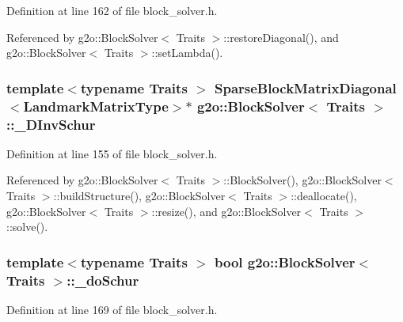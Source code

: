 Definition at line 162 of file block\+\_\+solver.\+h.



Referenced by g2o\+::\+Block\+Solver$<$ Traits $>$\+::restore\+Diagonal(), and g2o\+::\+Block\+Solver$<$ Traits $>$\+::set\+Lambda().

\subsubsection[{\texorpdfstring{\+\_\+\+D\+Inv\+Schur}{_DInvSchur}}]{\setlength{\rightskip}{0pt plus 5cm}template$<$typename Traits $>$ {\bf Sparse\+Block\+Matrix\+Diagonal}$<${\bf Landmark\+Matrix\+Type}$>$$\ast$ {\bf g2o\+::\+Block\+Solver}$<$ Traits $>$\+::\+\_\+\+D\+Inv\+Schur\hspace{0.3cm}{\ttfamily [protected]}}\hypertarget{classg2o_1_1BlockSolver_ad6a1a8f17c8fb854962a8204c79bc981}{}\label{classg2o_1_1BlockSolver_ad6a1a8f17c8fb854962a8204c79bc981}


Definition at line 155 of file block\+\_\+solver.\+h.



Referenced by g2o\+::\+Block\+Solver$<$ Traits $>$\+::\+Block\+Solver(), g2o\+::\+Block\+Solver$<$ Traits $>$\+::build\+Structure(), g2o\+::\+Block\+Solver$<$ Traits $>$\+::deallocate(), g2o\+::\+Block\+Solver$<$ Traits $>$\+::resize(), and g2o\+::\+Block\+Solver$<$ Traits $>$\+::solve().

\subsubsection[{\texorpdfstring{\+\_\+do\+Schur}{_doSchur}}]{\setlength{\rightskip}{0pt plus 5cm}template$<$typename Traits $>$ bool {\bf g2o\+::\+Block\+Solver}$<$ Traits $>$\+::\+\_\+do\+Schur\hspace{0.3cm}{\ttfamily [protected]}}\hypertarget{classg2o_1_1BlockSolver_ab375a5fac964182442f38288bd8a103a}{}\label{classg2o_1_1BlockSolver_ab375a5fac964182442f38288bd8a103a}


Definition at line 169 of file block\+\_\+solver.\+h.



